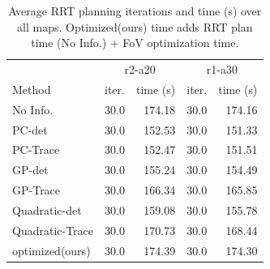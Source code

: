 \documentclass[letterpaper, 10 pt, conference]{ieeeconf}  %
\begin{document}
\begin{table}[t]
\centering
\caption{Average RRT planning iterations and time (s) over all maps. Optimized(ours) time adds RRT plan time (No Info.) + FoV optimization time.}
\begin{tabular}{lrrrr}
\toprule
 & \multicolumn{2}{c}{r2-a20} & \multicolumn{2}{c}{r1-a30} \\
Method & iter. & time (s) & iter. & time (s) \\
\midrule
No Info.         & 30.0 & 174.18 & 30.0 & 174.16 \\
PC-det           & 30.0 & 152.53 & 30.0 & 151.33 \\
PC-Trace         & 30.0 & 152.47 & 30.0 & 151.51 \\
GP-det           & 30.0 & 155.24 & 30.0 & 154.49 \\
GP-Trace         & 30.0 & 166.34 & 30.0 & 165.85 \\
Quadratic-det    & 30.0 & 159.08 & 30.0 & 155.78 \\
Quadratic-Trace  & 30.0 & 170.73 & 30.0 & 168.44 \\
optimized(ours)  & 30.0 & 174.39 & 30.0 & 174.30 \\
\bottomrule
\end{tabular}
\end{table}
\end{document}
